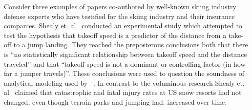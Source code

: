 \documentclass[smallextended]{svjour3}       %
\begin{document}

 Consider three examples of papers
co-authored by well-known skiing industry defense experts who have testified
for the skiing industry and their insurance companies. Shealy et. al~\cite{Shealy2010} conducted an experimental study which attempted
to test the hypothesis that takeoff speed is a predictor of the distance from a
take-off to a jump landing. They reached the preposterous conclusions both that there is ``no statistically significant relationship between takeoff speed and the distance traveled'' and that ``takeoff speed is not a dominant or controlling factor (in how far a jumper travels)''. These conclusions were used to question the soundness of analytical modeling used by ~\cite{Hubbard2009,McNeil2012}. In contrast to the voluminous research Shealy et. al~\cite{Shealy2015} claimed that catastrophic and fatal injury rates at US snow resorts had not changed, even though terrain parks and jumping had.  increased over time. 
\end{document}
